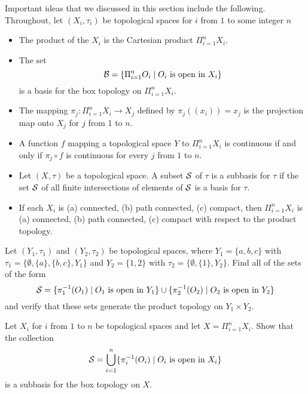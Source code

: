 \label{sec_prod_top_summ}
Important ideas that we discussed in this section include the following. Throughout, let $(X_i, \tau_i)$ be topological spaces for $i$ from $1$ to some integer $n$
\begin{itemize}
\item The product of the $X_i$ is the Cartesian product $\Pi_{i=1}^n X_i$. 
\item The set 
\[\mathcal{B} = \left\{ \Pi_{i=1}^n O_i \mid O_i \text{ is open in } X_i\right\}\]
 is a basis for the box topology on $\Pi_{i=1}^n X_i$. 
\item The mapping $\pi_j : \Pi_{i=1}^n X_i \to X_j$ defined by $\pi_j((x_i)) = x_j$ is the projection map onto $X_j$ for $j$ from 1 to $n$. 
\item A function $f$ mapping a topological space $Y$ to $\Pi_{i=1}^n X_i$ is continuous if and only if $\pi_j \circ f$ is continuous for every $j$ from $1$ to $n$. 
\item Let $(X, \tau)$ be a topological space. A subset $\mathcal{S}$ of $\tau$ is a subbasis for $\tau$ if the set $\mathcal{S}$ of all finite intersections of elements of $\mathcal{S}$ is a basis for $\tau$. 
\item If each $X_i$ is (a) connected, (b) path connected, (c) compact, then $\Pi_{i=1}^n X_i$ is (a) connected, (b) path connected, (c) compact with respect to the product topology.
\end{itemize}

\label{sec_prod_top_exer}

\be

\item \label{ex:subbasis}
\ba

\item Let $(Y_1, \tau_1)$ and $(Y_2, \tau_2)$ be topological spaces, where $Y_1 = \{a,b,c\}$ with $\tau_1 = \{\emptyset, \{a\}, \{b,c\}, Y_1\}$ and $Y_2 = \{1,2\}$ with $\tau_2 = \{\emptyset, \{1\}, Y_2\}$. Find all of the sets of the form 
\[\mathcal{S} = \{\pi_1^{-1}(O_1) \mid O_1 \text{ is open in } Y_1\} \cup \{\pi_2^{-1}(O_2) \mid O_2 \text{ is open in } Y_2\}\]
and verify that these sets generate the product topology on $Y_1 \times Y_2$. 

\item Let $X_{i}$ for $i$ from $1$ to $n$ be topological spaces and let $X = \Pi_{i=1}^n X_i$. Show that the collection
\[\mathcal{S} = \bigcup_{i=1}^n \{\pi_i^{-1}(O_i) \mid O_i \text{ is open in } X_i\}\]
is a subbasis for the box topology on $X$. 

\ea

